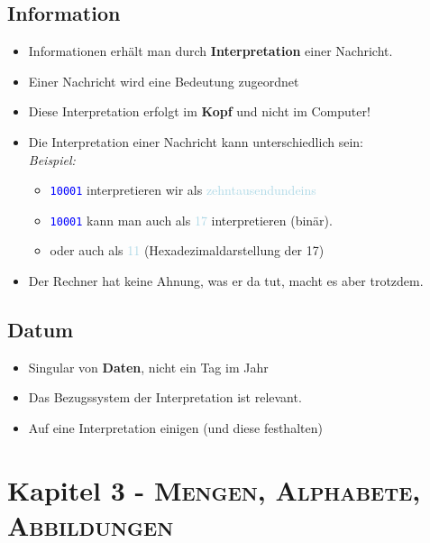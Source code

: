 \documentclass{article}
\newcommand{\kapitel}[2]{Kapitel #1 - \textsc{#2}}
\newcommand{\blue}[1]{\textcolor{blue}{#1}}
\newcommand{\babyblue}[1]{\textcolor{lightblue}{#1}}
\newcommand{\strongColor}[1]{\textcolor{strongColor}{#1}}
\newcommand{\strong}[1]{\textbf{\strongColor{#1}}}
\newcommand{\important}[1]{\textcolor{importantColor}{#1}}
\newcommand{\example}[1]{\textit{Beispiel: }#1}
\newcommand{\word}[1]{\blue{\texttt{#1}}}
\newcommand{\interpretation}[1]{\babyblue{#1}}
\begin{document}
\subsection{Information}
\begin{itemize}
    \item Informationen erhält man durch \strong{Interpretation} einer Nachricht.
    \item Einer Nachricht wird eine Bedeutung zugeordnet
    \item Diese Interpretation erfolgt im \strong{Kopf} und nicht im Computer!
    \item Die Interpretation einer Nachricht kann unterschiedlich sein:\\\example
    \begin{itemize}
        \item \word{10001} interpretieren wir als \interpretation{zehntausendundeins}
        \item \word{10001} kann man auch als \interpretation{17} interpretieren (binär).
        \item oder auch als \interpretation{11} (Hexadezimaldarstellung der 17)
    \end{itemize}
    \item Der Rechner hat \dq keine Ahnung\dq{}, was er da tut, macht es aber trotzdem.
\end{itemize}

\subsection{Datum}
\begin{itemize}
    \item Singular von \strong{Daten}, nicht ein Tag im Jahr
    \item Das Bezugssystem der Interpretation ist relevant.
    \item \important{Auf eine Interpretation einigen (und diese festhalten)}
\end{itemize}

\newpage
\section{\kapitel{3}{Mengen, Alphabete, Abbildungen}}
\end{document}
